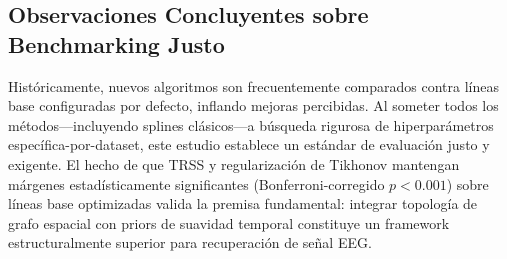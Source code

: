 \subsection{Observaciones Concluyentes sobre Benchmarking Justo}
Históricamente, nuevos algoritmos son frecuentemente comparados contra líneas base configuradas por defecto, inflando mejoras percibidas. Al someter todos los métodos---incluyendo splines clásicos---a búsqueda rigurosa de hiperparámetros específica-por-dataset, este estudio establece un estándar de evaluación justo y exigente. El hecho de que TRSS y regularización de Tikhonov mantengan márgenes estadísticamente significantes (Bonferroni-corregido $p < 0.001$) sobre líneas base optimizadas valida la premisa fundamental: integrar topología de grafo espacial con priors de suavidad temporal constituye un framework estructuralmente superior para recuperación de señal EEG.
